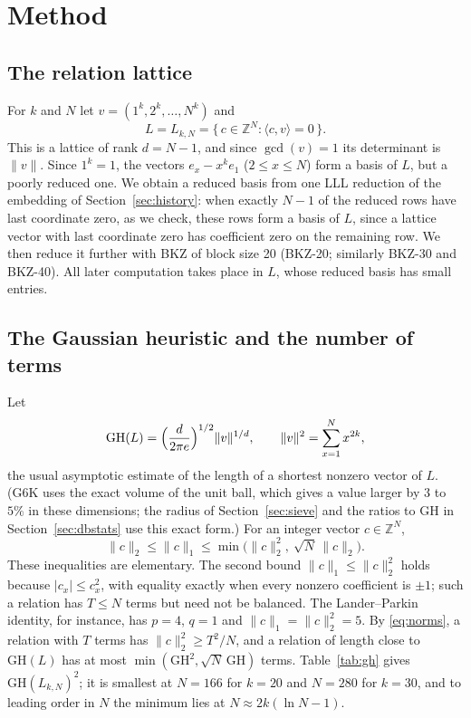 \documentclass[11pt]{amsart}
\theoremstyle{definition}
\theoremstyle{remark}
\newcommand{\Z}{\mathbb{Z}}
\newcommand{\GH}{\mathrm{GH}}
\begin{document}
\section{Method}\label{sec:method}

\subsection{The relation lattice}
For $k$ and $N$ let $v=(1^k,2^k,\dots,N^k)$ and
\[
L=L_{k,N}=\{\,c\in\Z^N : \langle c,v\rangle=0\,\}.
\]
This is a lattice of rank $d=N-1$, and since $\gcd(v)=1$ its determinant is $\|v\|$. Since
$1^k=1$, the vectors $e_x-x^ke_1$ ($2\le x\le N$) form a basis of $L$, but a poorly reduced
one. We obtain a reduced basis from one LLL reduction of the embedding of
Section~\ref{sec:history}: when exactly $N-1$ of the reduced rows have last coordinate zero, as
we check, these rows form a basis of $L$, since a lattice vector with last coordinate zero has
coefficient zero on the remaining row. We then reduce it further with BKZ of block size 20
(BKZ-20; similarly BKZ-30 and BKZ-40). All later computation takes place
in $L$, whose reduced basis has small entries.

\subsection{The Gaussian heuristic and the number of terms}\label{sec:gh}
Let
\begin{equation}\label{eq:gh}
\GH(L)=\Bigl(\frac{d}{2\pi e}\Bigr)^{1/2}\|v\|^{1/d},\qquad \|v\|^2=\sum_{x=1}^{N}x^{2k},
\end{equation}
the usual asymptotic estimate of the length of a shortest nonzero vector of $L$. (G6K uses the
exact volume of the unit ball, which gives a value larger by $3$ to $5\%$ in these dimensions;
the radius of Section~\ref{sec:sieve} and the ratios to $\GH$ in Section~\ref{sec:dbstats} use
this exact form.) For an integer vector
$c\in\Z^N$,
\begin{equation}\label{eq:norms}
\|c\|_2\le\|c\|_1\le\min\bigl(\|c\|_2^2,\ \sqrt N\,\|c\|_2\bigr).
\end{equation}
These inequalities are elementary. The second bound $\|c\|_1\le\|c\|_2^2$ holds because
$|c_x|\le c_x^2$, with equality exactly when every nonzero coefficient is $\pm1$; such a
relation has $T\le N$ terms but need not be balanced. The Lander--Parkin identity, for
instance, has $p=4$, $q=1$ and $\|c\|_1=\|c\|_2^2=5$. By \eqref{eq:norms}, a relation with
$T$ terms has $\|c\|_2^2\ge T^2/N$, and a relation of length close to $\GH(L)$ has at most
$\min(\GH^2,\sqrt N\,\GH)$ terms. Table~\ref{tab:gh} gives $\GH(L_{k,N})^2$; it is smallest at
$N=166$ for $k=20$ and $N=280$ for $k=30$, and to leading order in $N$ the minimum lies at
$N\approx2k(\ln N-1)$.
\end{document}
